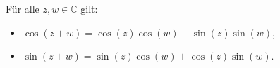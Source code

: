 Für alle $z, w \in \mathbb{C}$ gilt:
\begin{itemize}
    \item $\cos(z+w) = \cos(z) \cos(w) - \sin(z) \sin(w)$,  
    \item $\sin(z+w) = \sin(z) \cos(w) + \cos(z) \sin(w)$.
\end{itemize}